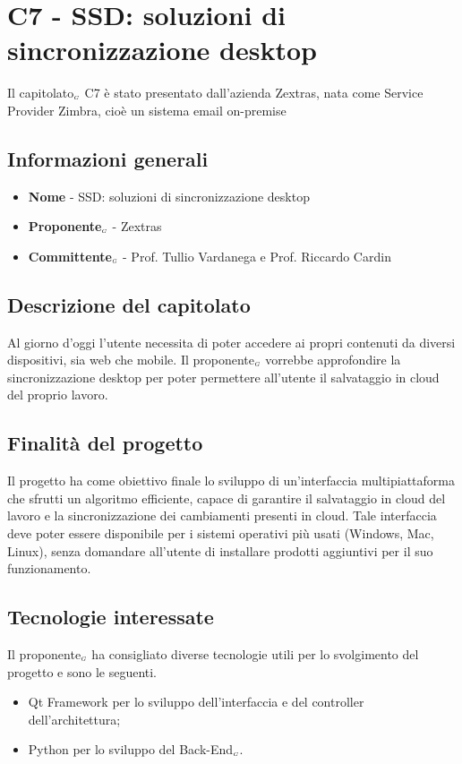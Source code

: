 \chapter{C7 - SSD: soluzioni di sincronizzazione desktop}
\label{CapitolatoC7}
Il capitolato$_{\scaleto{G}{3pt}}$ C7 è stato presentato dall'azienda Zextras, nata come Service Provider Zimbra, cioè un sistema email on-premise
\section{Informazioni generali} \label{C7InformazioniGenerali}
\begin{itemize}
	\item \textbf{Nome} - SSD: soluzioni di sincronizzazione desktop
	\item \textbf{Proponente}$_{\scaleto{G}{3pt}}$ - Zextras
	\item \textbf{Committente}$_{\scaleto{G}{3pt}}$ - Prof. Tullio Vardanega e Prof. Riccardo Cardin
\end{itemize}
\section{Descrizione del capitolato} \label{C7DescrizioneDelCapitolato}
Al giorno d'oggi l'utente necessita di poter accedere ai propri contenuti da diversi dispositivi, sia web che mobile. Il proponente$_{\scaleto{G}{3pt}}$ vorrebbe approfondire la sincronizzazione desktop per poter permettere all'utente il salvataggio in cloud del proprio lavoro.
\section{Finalità del progetto} \label{C7FinalitàDelProgetto}
Il progetto ha come obiettivo finale lo sviluppo di un'interfaccia multipiattaforma che sfrutti un algoritmo efficiente, capace di garantire il salvataggio in cloud del lavoro e la sincronizzazione dei cambiamenti presenti in cloud. Tale interfaccia deve poter essere disponibile per i sistemi operativi più usati (Windows, Mac, Linux), senza domandare all'utente di installare prodotti aggiuntivi per il suo funzionamento. 
\section{Tecnologie interessate} \label{C7TecnologieInteressate}
Il proponente$_{\scaleto{G}{3pt}}$ ha consigliato diverse tecnologie utili per lo svolgimento del progetto e sono le seguenti.
\begin{itemize}
	\item Qt Framework per lo sviluppo dell'interfaccia e del controller dell'architettura;
	\item Python per lo sviluppo del Back-End$_{\scaleto{G}{3pt}}$.
\end{itemize}
